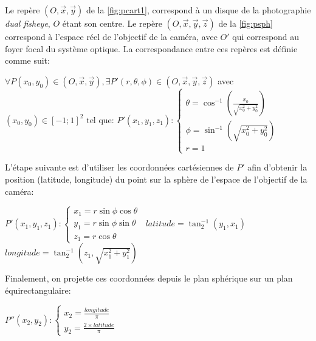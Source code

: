 			\par
			Le repère $(O,\vec{x},\vec{y})$ de la \autoref{fig:pcart1}, correspond à un disque de la photographie \emph{dual fisheye}, $O$ étant son centre.
			Le repère $(O,\vec{x},\vec{y},\vec{z})$ de la \autoref{fig:psph} correspond à l'espace réel de l'objectif de la caméra, avec $O'$ qui correspond au foyer focal du système optique.
			La correspondance entre ces repères est définie comme suit:
			\begin{center}
				$\forall P(x_{0},y_{0}) \in (O,\vec{x},\vec{y}), \exists P'(r,\theta,\phi) \in (O,\vec{x},\vec{y},\vec{z})$ avec $(x_{0},y_{0}) \in [-1;1]^2$ tel que: \newline
				$P'(x_{1},y_{1},z_{1}): \left\{
				\begin{array}{ll}
				\theta = \cos^{-1}{\left(\frac{x_{0}}{\sqrt{x_{0}^2+y_{0}^2}}\right)} \\
				\phi = \sin^{-1}{\left(\sqrt{x_{0}^2+y_{0}^2}\right)} \\
				r = 1
				\end{array}
				\right.\ $
			\end{center}
			L'étape suivante est d'utiliser les coordonnées cartésiennes de $P'$ afin d'obtenir la position (latitude, longitude) du point sur la sphère de l'espace de l'objectif de la caméra:
			\begin{center}
				$P'(x_{1},y_{1},z_{1}): \left\{
				\begin{array}{ll}
				x_{1} = r \sin \phi \cos \theta \\
				y_{1} = r \sin \phi \sin \theta \\
				z_{1} = r \cos \theta
				\end{array}
				\right.\ $ \newline \newline
				$ latitude = \tan^{-1}_{2}\left(y_{1}, x_{1}\right) $ \newline
				$ longitude = \tan^{-1}_{2}\left(z_{1}, \sqrt{x_{1}^2+y_{1}^2}\right) $ \newline
			\end{center}
			Finalement, on projette ces coordonnées depuis le plan sphérique sur un plan équirectangulaire:
			\begin{center}
				$P''(x_{2},y_{2}): \left\{
				\begin{array}{ll}
				x_{2} = \frac{longitude}{\pi} \\
				y_{2} = \frac{2 \times latitude}{\pi}
				\end{array}
				\right.\ $ \newline \newline
			\end{center}
			
